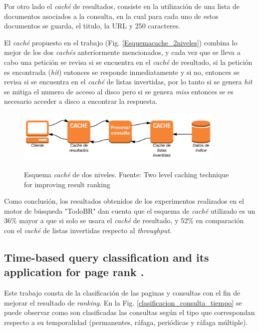 \documentclass[12pt]{ociamthesis}  %
\begin{document}
Por otro lado el \textit{caché} de resultados, consiste en la utilización de una lista de documentos asociados a la consulta, en la cual para cada uno de estos documentos se guarda, el titulo, la URL y 250 caracteres.\\
\clearpage

El \textit{caché} propuesto en el trabajo \cite{singh2011two}(Fig. \ref{Esquemacache_2niveles}) combina lo mejor de los dos \textit{cachés} anteriormente mencionados, y cada vez que se lleva a cabo una petición se revisa si se encuentra en el \textit{caché} de resultado, si la petición es encontrada (\textit{hit}) entonces se responde inmediatamente y si no, entonces se revisa si se encuentra en el \textit{caché} de listas invertidas, por lo tanto si se genera \textit{hit} se mitiga el numero de acceso al disco pero si se genera \textit{miss} entonces se es necesario acceder a disco a encontrar la respuesta.

\begin{figure}[!htb]
	\centering
	\includegraphics[width=10cm]{Imagenes/Paper2.1/EsquemaCache_2niveles}\\
	\caption{Esquema \textit{caché} de dos niveles. Fuente: Two level caching technique for improving result ranking \cite{singh2011two}}
	\label{Esquemaca
		che_2niveles}
\end{figure}
Como conclusión, los resultados obtenidos de los experimentos realizados en el motor de búsqueda "TodoBR" dan cuenta que el esquema de \textit{caché} utilizado es un 36\% mayor a que si solo se usara el \textit{caché} de resultado, y 52\% en comparación con el \textit{caché} de listas invertidas respecto al \textit{throughput}. 

\subsection{Time-based query classification and its application for page rank \cite{chen2011time}.}

Este trabajo consta de la clasificación de las paginas y consultas con el fin de mejorar el resultado de \textit{ranking}. En la Fig. \ref{clasificacion_consulta_tiempo} se puede observar como son clasificadas las consultas según el tipo que correspondan respecto a su temporalidad (permanentes, ráfaga, periódicas y ráfaga múltiple).
\end{document}
